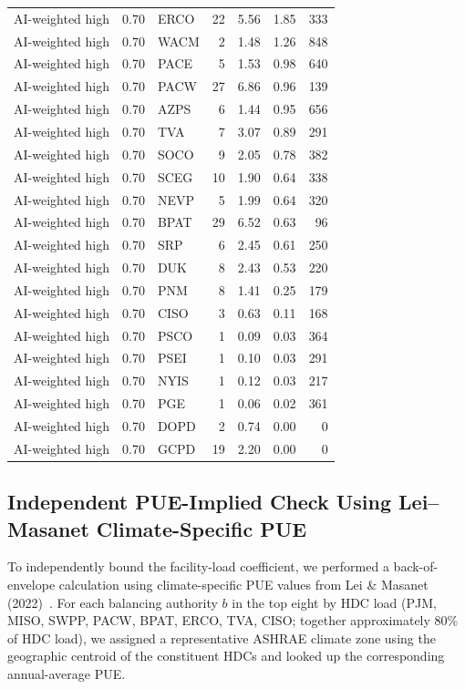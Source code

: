 \documentclass[12pt]{article}
\begin{document}
\begin{landscape}
\begin{longtable}{ll l r r r r}
AI-weighted high & 0.70 & ERCO & 22 & 5.56 & 1.85 & 333 \\
AI-weighted high & 0.70 & WACM & 2 & 1.48 & 1.26 & 848 \\
AI-weighted high & 0.70 & PACE & 5 & 1.53 & 0.98 & 640 \\
AI-weighted high & 0.70 & PACW & 27 & 6.86 & 0.96 & 139 \\
AI-weighted high & 0.70 & AZPS & 6 & 1.44 & 0.95 & 656 \\
AI-weighted high & 0.70 & TVA & 7 & 3.07 & 0.89 & 291 \\
AI-weighted high & 0.70 & SOCO & 9 & 2.05 & 0.78 & 382 \\
AI-weighted high & 0.70 & SCEG & 10 & 1.90 & 0.64 & 338 \\
AI-weighted high & 0.70 & NEVP & 5 & 1.99 & 0.64 & 320 \\
AI-weighted high & 0.70 & BPAT & 29 & 6.52 & 0.63 & 96 \\
AI-weighted high & 0.70 & SRP & 6 & 2.45 & 0.61 & 250 \\
AI-weighted high & 0.70 & DUK & 8 & 2.43 & 0.53 & 220 \\
AI-weighted high & 0.70 & PNM & 8 & 1.41 & 0.25 & 179 \\
AI-weighted high & 0.70 & CISO & 3 & 0.63 & 0.11 & 168 \\
AI-weighted high & 0.70 & PSCO & 1 & 0.09 & 0.03 & 364 \\
AI-weighted high & 0.70 & PSEI & 1 & 0.10 & 0.03 & 291 \\
AI-weighted high & 0.70 & NYIS & 1 & 0.12 & 0.03 & 217 \\
AI-weighted high & 0.70 & PGE & 1 & 0.06 & 0.02 & 361 \\
AI-weighted high & 0.70 & DOPD & 2 & 0.74 & 0.00 & 0 \\
AI-weighted high & 0.70 & GCPD & 19 & 2.20 & 0.00 & 0 \\
\bottomrule
\end{longtable}
\end{landscape}


\subsection{Independent PUE-Implied Check Using Lei--Masanet Climate-Specific PUE}
\label{sm:s3_pue_check}

To independently bound the facility-load coefficient, we performed a
back-of-envelope calculation using climate-specific PUE values from
Lei \& Masanet (2022)~\cite{lei2022climatepue}. For each balancing
authority $b$ in the top eight by HDC load (PJM, MISO, SWPP, PACW, BPAT,
ERCO, TVA, CISO; together approximately 80\% of HDC load), we assigned a representative
ASHRAE climate zone using the geographic centroid of the constituent HDCs
and looked up the corresponding annual-average PUE.
\end{document}
